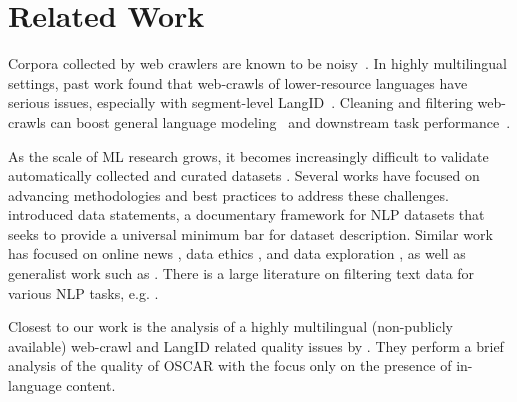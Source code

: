 \section{Related Work}\label{sec:related}

Corpora collected by web crawlers are known to be noisy~\citep{junczys-dowmunt-2019-microsoft}. In highly multilingual settings, past work found that web-crawls of lower-resource languages have serious issues, especially with segment-level LangID~\citep{caswell-etal-2020-language}.
Cleaning and filtering web-crawls can boost general language modeling~\citep{gao-etal-2020-the,brown-etal-2020-language,raffel-etal-2020-exploring} and downstream task performance~\citep{moore-lewis-2010-intelligent,xu-koehn-2017-zipporah,khayrallah-koehn-2018-impact,brown-etal-2020-language}.

As the scale of ML research grows, it becomes increasingly difficult to validate automatically collected and curated datasets \citep{biderman-etal-2020-pitfalls,prabhu2020large,bender2021dangers}.
Several works have focused on advancing methodologies and best practices to address these challenges. \citet{bender2018data} introduced data statements, a documentary framework for NLP datasets that seeks to provide a universal minimum bar for dataset description. Similar work has focused on
online news \citep{kevin-etal-2018-information}, data ethics \citep{sun2019mithralabel}, and data exploration \citep{holland2018dataset}, as well as generalist work such as \citep{gebru2018datasheets}. There is a large literature on filtering text data for various NLP tasks, e.g. \cite{axelrod-etal-2011-domain,moore-lewis-2010-intelligent,wang2018denoising,kamholz-etal-2014-panlex,junczys-dowmunt-2018-dual,caswell-etal-2020-language}.

Closest to our work is the analysis of a highly multilingual (non-publicly available) web-crawl and LangID related quality issues by \citet{caswell-etal-2020-language}.
They perform a brief analysis of the quality of OSCAR
with the focus only on the presence of in-language content.

